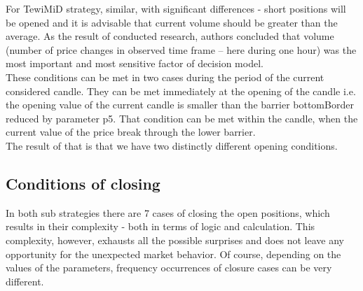 \documentclass{tewiart}
\begin{document}
For TewiMiD strategy, similar, with significant differences - short positions will be opened and it is advisable that current volume should be greater  than the average. As the result of conducted research, authors concluded that volume (number of price changes in observed time frame – here during one hour) was the most important and most sensitive factor of decision model.\\

These conditions can be met in two cases during the period of the current considered candle. They can be met immediately at the opening of the candle i.e. the opening value of the current candle is smaller than the barrier bottomBorder reduced by parameter p5. That condition can be met within the candle, when the current value of the price break through the lower barrier. \\

The result of that is that we have two distinctly different opening conditions.

\subsection{Conditions of closing}
In both sub strategies there are 7 cases of closing the open positions, which results in their complexity - both in terms of logic and calculation. This complexity, however, exhausts all the possible surprises and does not  leave any opportunity for the unexpected market behavior. Of course, depending on the values of the parameters, frequency occurrences of closure cases can be very different.\\
\end{document}
